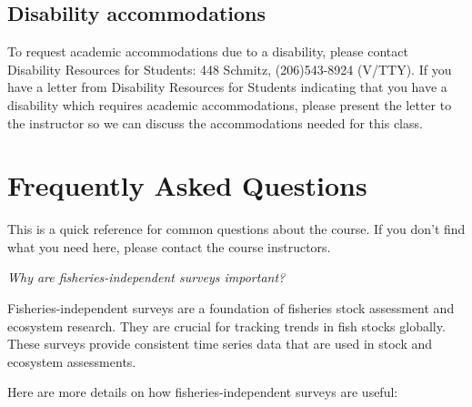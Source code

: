 \documentclass[
  letterpaper,
  oneside,
  open=any]{scrbook}
\begin{document}
\section{Disability accommodations}\label{disability-accommodations}

To request academic accommodations due to a disability, please contact
Disability Resources for Students: 448 Schmitz, (206)543-8924 (V/TTY).
If you have a letter from Disability Resources for Students indicating
that you have a disability which requires academic accommodations,
please present the letter to the instructor so we can discuss the
accommodations needed for this class.


\chapter{Frequently Asked Questions}\label{frequently-asked-questions}

This is a quick reference for common questions about the course. If you
don't find what you need here, please contact the course instructors.

\emph{Why are fisheries-independent surveys important?}

Fisheries-independent surveys are a foundation of fisheries stock
assessment and ecosystem research. They are crucial for tracking trends
in fish stocks globally. These surveys provide consistent time series
data that are used in stock and ecosystem assessments.

Here are more details on how fisheries-independent surveys are useful:
\end{document}
